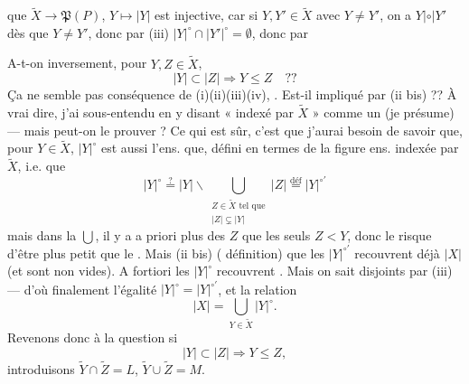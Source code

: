 \documentclass[11pt,a4paper]{article}
\begin{document}
  que $\tilde{X} \to \mathfrak{P}(P)$, $Y \mapsto |Y|$ est
injective, car si $Y, Y' \in \tilde{X}$ avec $Y \neq Y'$, on a
$Y \mathbin{|{\circ}|} Y'$  dès que $Y \neq Y'$, donc par (iii)
$|Y|^\circ \cap |Y'|^\circ = \emptyset$, donc par 

A-t-on inversement, pour $Y, Z \in \tilde{X}$,
\[
|Y| \subset |Z| \Longrightarrow Y \leq Z \quad ??
\]
Ça ne semble pas conséquence de (i)(ii)(iii)(iv), . Est-il impliqué par (ii bis) ??  À vrai dire,
j'ai sous-entendu en y disant « indexé par $\tilde{X}$ » \ill{} comme un
 (je présume) — mais peut-on le prouver ?
 Ce qui est sûr, c'est que j'aurai
besoin de savoir que, pour $Y \in \tilde{X}$, $|Y|^\circ$ est aussi l'ens.
 \ill{} que, défini en termes de la figure ens. indexée par
$\tilde{X}$, i.e. que
\[
|Y|^\circ \overset{?}{=} |Y| \smallsetminus \bigcup_{\substack{Z \in \tilde{X} \text{ tel que}\\ |Z| \subsetneq |Y|}} |Z| \overset{\text{déf}}{=} |Y|^{\circ\prime}
\]
mais dans la $\bigcup$, il y a a priori  plus des $Z$ que
 les seuls $Z < Y$, donc le \ill{} risque d'être plus petit
 que le . Mais (ii bis)
(\ill{} définition) \ill{} que les $|Y|^{\circ\prime}$ recouvrent déjà $|X|$ (et
sont non vides). A fortiori les $|Y|^\circ$ recouvrent . Mais on
sait  disjoints par (iii) — d'où finalement
l'égalité $|Y|^\circ = |Y|^{\circ\prime}$, et la relation
\[
|X| = \bigcup_{Y \in \tilde{X}} |Y|^\circ .
\]
Revenons donc à la question si
\[
|Y| \subset |Z| \Longrightarrow Y \leq Z ,
\]
introduisons
$\tilde{Y} \cap \tilde{Z} = L$, \struck{\ill{}} $\tilde{Y} \cup \tilde{Z} = M$.
\end{document}

